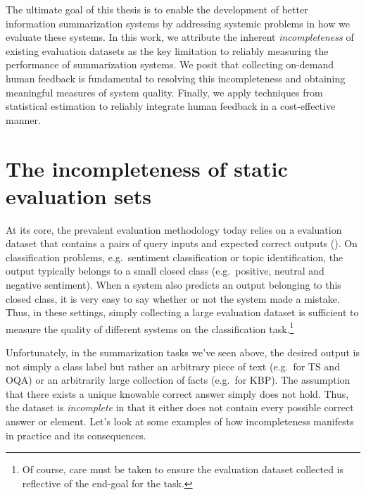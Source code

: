 The ultimate goal of this thesis is to enable the development of better information summarization systems by addressing systemic problems in how we evaluate these systems.
In this work, we attribute the inherent \textit{incompleteness} of existing evaluation datasets as the key limitation to reliably measuring the performance of summarization systems.
We posit that collecting on-demand human feedback is fundamental to resolving this incompleteness and obtaining meaningful measures of system quality.
Finally, we apply techniques from statistical estimation to reliably integrate human feedback in a cost-effective manner.

\section{The incompleteness of static evaluation sets}
At its core, the prevalent evaluation methodology today relies on a evaluation dataset that contains a pairs of query inputs and expected correct outputs ().
On classification problems, e.g.\ sentiment classification or topic identification, the output typically belongs to a small closed class (e.g.\ positive, neutral and negative sentiment).
When a system also predicts an output belonging to this closed class, it is very easy to say whether or not the system made a mistake.
Thus, in these settings, simply collecting a large evaluation dataset is sufficient to measure the quality of different systems on the classification task.\footnote{%
Of course, care must be taken to ensure the evaluation dataset collected is reflective of the end-goal for the task.}

Unfortunately, in the summarization tasks we've seen above, the desired output is not simply a class label but rather an arbitrary piece of text (e.g.\ for TS and OQA) or an arbitrarily large collection of facts (e.g.\ for KBP).
The assumption that there exists a unique knowable correct answer simply does not hold.
Thus, the dataset is \textit{incomplete} in that it either does not contain every possible correct answer or element.
Let's look at some examples of how incompleteness manifests in practice and its consequences.

